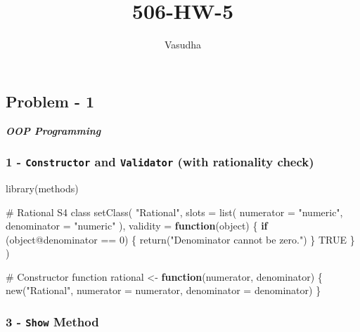 \documentclass[
  12pt,
]{article}
\title{506-HW-5}
\author{Vasudha}
\date{}
\newenvironment{Shaded}{\begin{snugshade}}{\end{snugshade}}
\newcommand{\AttributeTok}[1]{\textcolor[rgb]{0.40,0.45,0.13}{#1}}
\newcommand{\CommentTok}[1]{\textcolor[rgb]{0.37,0.37,0.37}{#1}}
\newcommand{\ConstantTok}[1]{\textcolor[rgb]{0.56,0.35,0.01}{#1}}
\newcommand{\ControlFlowTok}[1]{\textcolor[rgb]{0.00,0.23,0.31}{\textbf{#1}}}
\newcommand{\DecValTok}[1]{\textcolor[rgb]{0.68,0.00,0.00}{#1}}
\newcommand{\FunctionTok}[1]{\textcolor[rgb]{0.28,0.35,0.67}{#1}}
\newcommand{\NormalTok}[1]{\textcolor[rgb]{0.00,0.23,0.31}{#1}}
\newcommand{\OtherTok}[1]{\textcolor[rgb]{0.00,0.23,0.31}{#1}}
\newcommand{\SpecialCharTok}[1]{\textcolor[rgb]{0.37,0.37,0.37}{#1}}
\newcommand{\StringTok}[1]{\textcolor[rgb]{0.13,0.47,0.30}{#1}}
\begin{document}
\maketitle


\subsection{Problem - 1}\label{problem---1}

\textbf{\emph{OOP Programming}}

\subsubsection{\texorpdfstring{1 - \texttt{Constructor} and
\texttt{Validator} (with rationality
check)~}{1 - Constructor and Validator (with rationality check)~}}\label{constructor-and-validator-with-rationality-check}

\begin{Shaded}
\begin{Highlighting}[]
\FunctionTok{library}\NormalTok{(methods)}

\CommentTok{\# Rational S4 class}
\FunctionTok{setClass}\NormalTok{(}
  \StringTok{"Rational"}\NormalTok{,}
  \AttributeTok{slots =} \FunctionTok{list}\NormalTok{(}
    \AttributeTok{numerator =} \StringTok{"numeric"}\NormalTok{,}
    \AttributeTok{denominator =} \StringTok{"numeric"}
\NormalTok{  ),}
  \AttributeTok{validity =} \ControlFlowTok{function}\NormalTok{(object) \{}
    \ControlFlowTok{if}\NormalTok{ (object}\SpecialCharTok{@}\NormalTok{denominator }\SpecialCharTok{==} \DecValTok{0}\NormalTok{) \{}
      \FunctionTok{return}\NormalTok{(}\StringTok{"Denominator cannot be zero."}\NormalTok{)}
\NormalTok{    \}}
    \ConstantTok{TRUE}
\NormalTok{  \}}
\NormalTok{)}

\CommentTok{\# Constructor function}
\NormalTok{rational }\OtherTok{\textless{}{-}} \ControlFlowTok{function}\NormalTok{(numerator, denominator) \{}
  \FunctionTok{new}\NormalTok{(}\StringTok{"Rational"}\NormalTok{, }\AttributeTok{numerator =}\NormalTok{ numerator, }\AttributeTok{denominator =}\NormalTok{ denominator)}
\NormalTok{\}}
\end{Highlighting}
\end{Shaded}

\subsubsection{\texorpdfstring{3 - \texttt{Show}
Method}{3 - Show Method}}\label{show-method}
\end{document}

